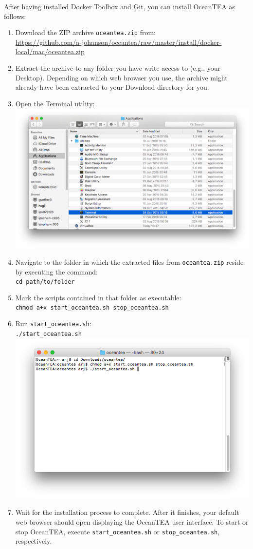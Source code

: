 \documentclass[12pt,a4paper,english,oneside,parskip=false]{scrartcl} %
\begin{document}
After having installed Docker Toolbox and Git, you can install OceanTEA as follows:
\begin{enumerate}
	\item Download the ZIP archive \texttt{oceantea.zip} from:\\
	\url{https://github.com/a-johanson/oceantea/raw/master/install/docker-local/mac/oceantea.zip}
	\item Extract the archive to any folder you have write access to (e.g., your Desktop). 
	Depending on which web browser you use, the archive might already have been extracted to your Download directory for you. 
	\item Open the Terminal utility:\\
	\includegraphics[width=\linewidth]{fig/start_terminal}
	\item Navigate to the folder in which the extracted files from \texttt{oceantea.zip} reside by executing the command:\\
	\texttt{cd path/to/folder}
	\item Mark the scripts contained in that folder as executable:\\
	\texttt{chmod a+x start\_oceantea.sh stop\_oceantea.sh}
	\item Run \texttt{start\_oceantea.sh}:\\
	\texttt{./start\_oceantea.sh}\\
	\includegraphics[width=\linewidth]{fig/terminal_input}
	\item Wait for the installation process to complete. After it finishes, your default web browser should open displaying the OceanTEA user interface. 
	To start or stop OceanTEA, execute \texttt{start\_oceantea.sh} or \texttt{stop\_oceantea.sh}, respectively.
\end{enumerate}
\end{document}
